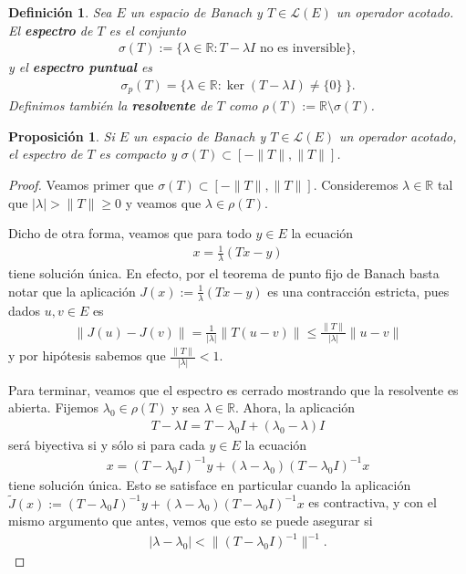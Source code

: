 \documentclass[11pt]{report}
\theoremstyle{colored}
\newtheorem{definition}{Definición}[section]
\newtheorem{proposition}{Proposición}[section]
\newcommand{\R}{\mathbb{R}}
\begin{document}
\begin{definition} Sea $E$ un espacio de Banach y $T \in \mathscr{L}(E)$ un operador acotado.
El \textbf{espectro} de $T$ es el conjunto
\begin{align*}
\sigma(T) := \{\lambda \in \R : T-\lambda I \text{ no es inversible} \},
\end{align*}
y el \textbf{espectro puntual} es
\begin{align*}
\sigma_p(T) = \{\lambda \in \R : \ker(T-\lambda I) \neq \{0\} \ \}.
\end{align*}
Definimos también la \textbf{resolvente} de $T$ como $\rho(T) := \R \setminus \sigma(T)$.
\end{definition}

\begin{proposition} Si $E$ un espacio de Banach y $T \in \mathscr{L}(E)$ un operador acotado, el espectro de $T$ es compacto y $\sigma(T) \subset [-\|T\|,\|T\|]$.  
\end{proposition}
\begin{proof} Veamos primer que $\sigma(T) \subset [-\|T\|,\|T\|]$. Consideremos $\lambda \in \R$ tal que $|\lambda| > \|T\| \geq 0$ y veamos que $\lambda \in \rho(T)$.

Dicho de otra forma, veamos que para todo $y \in E$ la ecuación
\begin{align*}
x = \frac{1}{\lambda}(Tx - y)
\end{align*}
tiene solución única. En efecto, por el teorema de punto fijo de Banach basta notar que la aplicación $J(x) := \frac{1}{\lambda}(Tx-y)$ es una contracción estricta, pues dados $u,v \in E$ es
\begin{align*}
\|J(u)-J(v)\| = \frac{1}{|\lambda|}\|T(u-v)\| \leq \frac{\|T\|}{|\lambda|}\|u-v\|
\end{align*}
y por hipótesis sabemos que $\frac{\|T\|}{|\lambda|} < 1$.

Para terminar, veamos que el espectro es cerrado mostrando que la resolvente es abierta. Fijemos $\lambda_0 \in \rho(T)$ y sea $\lambda \in \R$. Ahora, la aplicación
\begin{align*}
T-\lambda I = T-\lambda_0 I + (\lambda_0 - \lambda)I
\end{align*} 
será biyectiva si y sólo si para cada $y \in E$ la ecuación 
\begin{align*}
x = (T-\lambda_0 I)^{-1}y + (\lambda-\lambda_0)(T-\lambda_0 I)^{-1}x
\end{align*}
tiene solución única. Esto se satisface en particular cuando la aplicación $\widetilde{J}(x) := (T-\lambda_0 I)^{-1}y + (\lambda-\lambda_0)(T-\lambda_0 I)^{-1}x$ es contractiva, y con el mismo argumento que antes, vemos que esto se puede asegurar si
\begin{align*}
|\lambda-\lambda_0| < \|(T-\lambda_0 I)^{-1}\|^{-1}.
\end{align*}
\end{proof}
\end{document}
